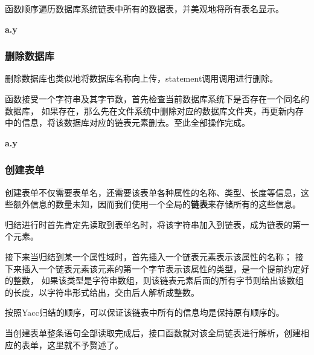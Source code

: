 \documentclass{article}
\begin{document}
\begin{spacing}{2}
            函数顺序遍历数据库系统链表中所有的数据表，并美观地将所有表名显示。

            \textbf{a.y}
            \begin{spacing}{1.15}
            
            \end{spacing}
        \subsubsection{删除数据库}
            删除数据库也类似地将数据库名称向上传，statement调用调用进行删除。

            函数接受一个字符串及其字节数，首先检查当前数据库系统下是否存在一个同名的数据库，
            如果存在，那么先在文件系统中删除对应的数据库文件夹，再更新内存中的信息，将该数据库对应的链表元素删去。至此全部操作完成。
            
            \textbf{a.y}
            \begin{spacing}{1.15}
            
            \end{spacing}

        \subsubsection{创建表单}
            创建表单不仅需要表单名，还需要该表单各种属性的名称、类型、长度等信息，这些额外信息的数量未知，因而我们使用一个全局的\textbf{链表}来存储所有的这些信息。
            
            归结进行时首先肯定先读取到表单名时，将该字符串加入到链表，成为链表的第一个元素。

            接下来当归结到某一个属性域时，首先插入一个链表元素表示该属性的名称；
            接下来插入一个链表元素该元素的第一个字节表示该属性的类型，是一个提前约定好的整数，
            如果该类型是字符串数组，则该链表元素后面的所有字节则给出该数组的长度，以字符串形式给出，交由后人解析成整数。

            按照Yacc归结的顺序，可以保证该链表中所有的信息均是保持原有顺序的。

            当创建表单整条语句全部读取完成后，接口函数就对该全局链表进行解析，创建相应的表单，这里就不予赘述了。


\end{spacing}
\end{document}
